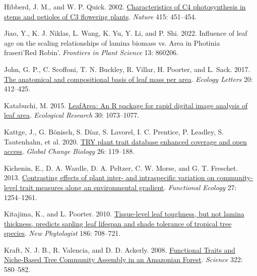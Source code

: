 \documentclass[
  12pt,
  a4paper,
,tablecaptionabove
]{scrartcl}
\newlength{\cslhangindent}
\newenvironment{CSLReferences}[2] %
 {%
  \setlength{\parindent}{0pt}
  \ifodd #1 \everypar{\setlength{\hangindent}{\cslhangindent}}\ignorespaces\fi
  \ifnum #2 > 0
  \setlength{\parskip}{#2\baselineskip}
  \fi
 }%
 {}
\begin{document}
\begin{CSLReferences}{1}{0}
\leavevmode{}%
Hibberd, J. M., and W. P. Quick. 2002. \href{https://doi.org/10.1038/415451a}{Characteristics of {C4} photosynthesis in stems and petioles of {C3} flowering plants}. \emph{Nature} 415: 451--454.

\leavevmode{}%
Jiao, Y., K. J. Niklas, L. Wang, K. Yu, Y. Li, and P. Shi. 2022. Influence of leaf age on the scaling relationships of lamina biomass vs. Area in {Photinia}\texttimes{} fraseri'{Red Robin}'. \emph{Frontiers in Plant Science} 13: 860206.

\leavevmode{}%
John, G. P., C. Scoffoni, T. N. Buckley, R. Villar, H. Poorter, and L. Sack. 2017. \href{https://doi.org/10.1111/ele.12739}{The anatomical and compositional basis of leaf mass per area}. \emph{Ecology Letters} 20: 412--425.

\leavevmode{}%
Katabuchi, M. 2015. \href{https://doi.org/10.1007/s11284-015-1307-x}{{LeafArea}: An {R} package for rapid digital image analysis of leaf area}. \emph{Ecological Research} 30: 1073--1077.

\leavevmode{}%
Kattge, J., G. Bönisch, S. Díaz, S. Lavorel, I. C. Prentice, P. Leadley, S. Tautenhahn, et al. 2020. \href{https://doi.org/10.1111/gcb.14904}{{TRY} plant trait database \textendash{} enhanced coverage and open access}. \emph{Global Change Biology} 26: 119--188.

\leavevmode{}%
Kichenin, E., D. A. Wardle, D. A. Peltzer, C. W. Morse, and G. T. Freschet. 2013. \href{https://doi.org/10.1111/1365-2435.12116}{Contrasting effects of plant inter- and intraspecific variation on community-level trait measures along an environmental gradient}. \emph{Functional Ecology} 27: 1254--1261.

\leavevmode{}%
Kitajima, K., and L. Poorter. 2010. \href{https://doi.org/10.1111/j.1469-8137.2010.03212.x}{Tissue-level leaf toughness, but not lamina thickness, predicts sapling leaf lifespan and shade tolerance of tropical tree species}. \emph{New Phytologist} 186: 708--721.

\leavevmode{}%
Kraft, N. J. B., R. Valencia, and D. D. Ackerly. 2008. \href{https://doi.org/10.1126/science.1160662}{Functional {Traits} and {Niche-Based Tree Community Assembly} in an {Amazonian Forest}}. \emph{Science} 322: 580--582.


\end{CSLReferences}
\end{document}
